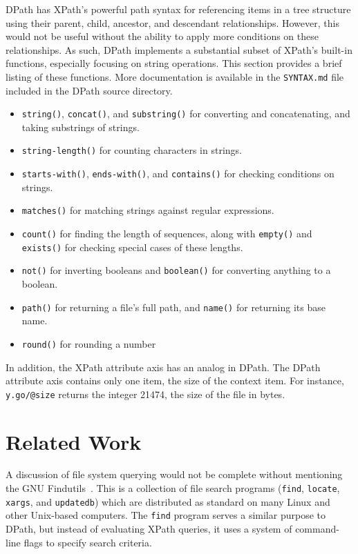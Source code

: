 \documentclass{article}
\begin{document}
DPath has XPath's powerful path syntax for referencing items in a tree structure
using their parent, child, ancestor, and descendant relationships. However, this
would not be useful without the ability to apply more conditions on these
relationships. As such, DPath implements a substantial subset of XPath's
built-in functions, especially focusing on string operations. This section
provides a brief listing of these functions. More documentation is available in
the \texttt{SYNTAX.md} file included in the DPath source directory.

\begin{itemize}
\item \texttt{string()}, \texttt{concat()}, and \texttt{substring()} for
  converting and concatenating, and taking substrings of strings.
\item \texttt{string-length()} for counting characters in strings.
\item \texttt{starts-with()}, \texttt{ends-with()}, and \texttt{contains()} for
  checking conditions on strings.
\item \texttt{matches()} for matching strings against regular expressions.
\item \texttt{count()} for finding the length of sequences, along with
  \texttt{empty()} and \texttt{exists()} for checking special cases of these
  lengths.
\item \texttt{not()} for inverting booleans and \texttt{boolean()} for
  converting anything to a boolean.
\item \texttt{path()} for returning a file's full path, and \texttt{name()} for
  returning its base name.
\item \texttt{round()} for rounding a number
\end{itemize}

In addition, the XPath attribute axis has an analog in DPath. The DPath
attribute axis contains only one item, the size of the context item. For
instance, \texttt{y.go/@size} returns the integer 21474, the size of the file in
bytes.

\section{Related Work}
\label{sec:related}

A discussion of file system querying would not be complete without mentioning
the GNU Findutils~\cite{find}. This is a collection of file search programs
(\texttt{find}, \texttt{locate}, \texttt{xargs}, and \texttt{updatedb}) which
are distributed as standard on many Linux and other Unix-based computers. The
\texttt{find} program serves a similar purpose to DPath, but instead of
evaluating XPath queries, it uses a system of command-line flags to specify
search criteria.
\end{document}

